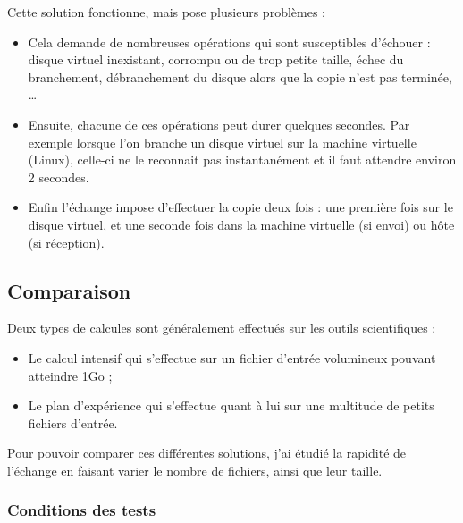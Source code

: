 Cette solution fonctionne, mais pose plusieurs problèmes :
\begin{itemize}
	\item Cela demande de nombreuses opérations qui sont susceptibles d'échouer : disque virtuel inexistant, corrompu ou de trop petite taille, échec du branchement, débranchement du disque alors que la copie n'est pas terminée, \ldots
	\item Ensuite, chacune de ces opérations peut durer quelques secondes.
Par exemple lorsque l'on branche un disque virtuel sur la machine virtuelle (Linux), celle-ci ne le reconnait pas instantanément et il faut attendre environ 2 secondes.
	\item Enfin l'échange impose d'effectuer la copie deux fois : une première fois sur le disque virtuel, et une seconde fois dans la machine virtuelle (si envoi) ou hôte (si réception).
\\
\end{itemize}





\subsection{Comparaison}
\label{Comparaison}

Deux types de calcules sont généralement effectués sur les outils scientifiques :
\begin{itemize}
	\item Le calcul intensif qui s'effectue sur un fichier d'entrée volumineux pouvant atteindre 1Go ;	
	\item Le plan d'expérience qui s'effectue quant à lui sur une multitude de petits fichiers d'entrée.
\end{itemize}

Pour pouvoir comparer ces différentes solutions, j'ai étudié la rapidité de l'échange en faisant varier le nombre de fichiers, ainsi que leur taille.
\\




\subsubsection{Conditions des tests}

